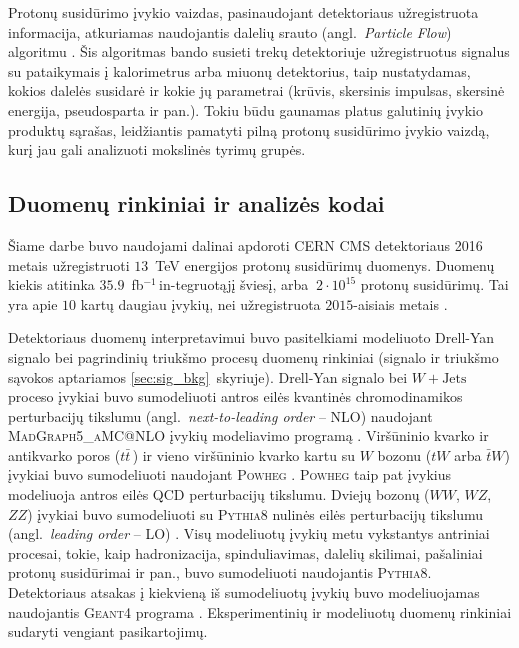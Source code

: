 \documentclass[a4paper, 12pt, oneside]{article}
\newcommand{\ZZ}{Z\! Z}
\newcommand{\WZ}{W\! Z}
\newcommand{\tbarW}{\bar{t}W}
\newcommand{\WJets}{W\! +\!\mathrm{Jets}}
\newcommand{\invfb}{fb$^{-1}\,$}
\begin{document}
Protonų susidūrimo įvykio vaizdas, pasinaudojant detektoriaus užregistruota informacija, atkuriamas naudojantis
dalelių srauto (angl.\ \textit{Particle Flow}) algoritmu \cite{ParticleFlow}.
Šis algoritmas bando susieti trekų detektoriuje užregistruotus signalus su pataikymais į kalorimetrus arba miuonų
detektorius, taip nustatydamas, kokios dalelės susidarė ir kokie jų parametrai (krūvis, skersinis impulsas,
skersinė energija, pseudosparta ir pan.).
Tokiu būdu gaunamas platus galutinių įvykio produktų sąrašas, leidžiantis pamatyti pilną protonų susidūrimo įvykio vaizdą,
kurį jau gali analizuoti mokslinės tyrimų grupės.

\subsection{Duomenų rinkiniai ir analizės kodai}\label{sec:data}

Šiame darbe buvo naudojami dalinai apdoroti CERN CMS detektoriaus 2016 metais užregistruoti $13$~TeV
energijos protonų susidūrimų duomenys.
Duomenų kiekis atitinka $35.9$~\invfb in-tegruotąjį šviesį, arba $~2 \cdot 10^{15}$ protonų susidūrimų.
Tai yra apie $10$ kartų daugiau įvykių, nei užregistruota $2015$-aisiais metais \cite{DY2019}.

Detektoriaus duomenų interpretavimui buvo pasitelkiami modeliuoto Drell-Yan signalo bei pagrindinių triukšmo
procesų duomenų rinkiniai (signalo ir triukšmo sąvokos aptariamos \ref{sec:sig_bkg}~skyriuje).
Drell-Yan signalo bei $\WJets$ proceso įvykiai buvo sumodeliuoti antros eilės kvantinės chromodinamikos
perturbacijų tikslumu  (angl.\ \textit{next-to-leading order} -- NLO) naudojant \textsc{MadGraph5\_aMC@NLO} įvykių
modeliavimo programą \cite{MG_aMCatNLO}.
Viršūninio kvarko ir antikvarko poros ($t\bar{t}\,$) ir vieno viršūninio kvarko kartu su $W$ bozonu ($tW$ arba
$\tbarW$) įvykiai buvo sumodeliuoti naudojant \textsc{Powheg} \cite{powheg_ttbar, powheg_tW}.
\textsc{Powheg} taip pat įvykius modeliuoja antros eilės QCD perturbacijų tikslumu.
Dviejų bozonų ($WW$, $\WZ$, $\ZZ$) įvykiai buvo sumodeliuoti su \textsc{Pythia8} nulinės eilės perturbacijų tikslumu
(angl.\ \textit{leading order} -- LO) \cite{pythia82}.
Visų modeliuotų įvykių metu vykstantys antriniai procesai, tokie, kaip hadronizacija, spinduliavimas, dalelių skilimai,
pašaliniai protonų susidūrimai ir pan., buvo sumodeliuoti naudojantis \textsc{Pythia8}.
Detektoriaus atsakas į kiekvieną iš sumodeliuotų įvykių buvo modeliuojamas naudojantis \textsc{Geant4} programa
\cite{geant4}.
Eksperimentinių ir modeliuotų duomenų rinkiniai sudaryti vengiant pasikartojimų.
\end{document}
